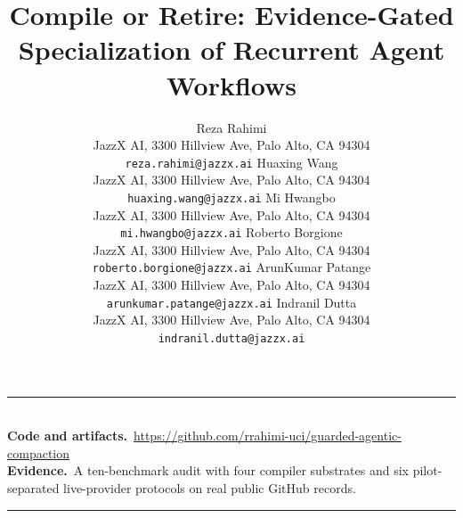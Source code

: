 \documentclass{article}
\title{Compile or Retire: Evidence-Gated Specialization of Recurrent Agent Workflows}
\author{%
  Reza Rahimi \\
  \normalfont\small JazzX AI, 3300 Hillview Ave, Palo Alto, CA 94304 \\
  \normalfont\small\texttt{reza.rahimi@jazzx.ai}
  \And
  Huaxing Wang \\
  \normalfont\small JazzX AI, 3300 Hillview Ave, Palo Alto, CA 94304 \\
  \normalfont\small\texttt{huaxing.wang@jazzx.ai}
  \AND
  Mi Hwangbo \\
  \normalfont\small JazzX AI, 3300 Hillview Ave, Palo Alto, CA 94304 \\
  \normalfont\small\texttt{mi.hwangbo@jazzx.ai}
  \And
  Roberto Borgione \\
  \normalfont\small JazzX AI, 3300 Hillview Ave, Palo Alto, CA 94304 \\
  \normalfont\small\texttt{roberto.borgione@jazzx.ai}
  \AND
  ArunKumar Patange \\
  \normalfont\small JazzX AI, 3300 Hillview Ave, Palo Alto, CA 94304 \\
  \normalfont\small\texttt{arunkumar.patange@jazzx.ai}
  \And
  Indranil Dutta \\
  \normalfont\small JazzX AI, 3300 Hillview Ave, Palo Alto, CA 94304 \\
  \normalfont\small\texttt{indranil.dutta@jazzx.ai}}
\date{}
\theoremstyle{plain}
\theoremstyle{definition}
\begin{document}
\maketitle

\begin{abstract}

\end{abstract}


\vskip 0.1in
\noindent\rule{\textwidth}{0.4pt}\\[0.8mm]
{\small\textbf{Code and artifacts.}\ \url{https://github.com/rrahimi-uci/guarded-agentic-compaction}\\
\textbf{Evidence.}\ A ten-benchmark audit with four compiler substrates and six
pilot-separated live-provider protocols on real public GitHub records.}\\[-1mm]
\rule{\textwidth}{0.4pt}

\clearpage
\tableofcontents
\clearpage






\appendix

\end{document}
